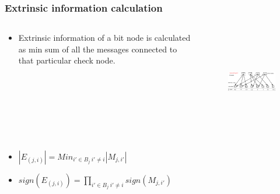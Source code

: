 \documentclass[xcolor=dvipsname]
{beamer}
\begin{document}
\begin{frame}[t]
\frametitle{ Extrinsic information calculation }  
\vspace{-5mm}
\begin{columns}[totalwidth=\textwidth]
	\begin{column}{0.3\textwidth}
	\centering
	\begin{itemize}
	\item Extrinsic information of a bit node is calculated as min sum of all the messages connected to 
	that particular check node. 	
	\end{itemize}
 
			
	\end{column}%
	   		
	\begin{column}{0.7\textwidth}
	\centering
	\begin{figure}
	\includegraphics[height=4.5cm,width=8cm]{minSum4}
	\end{figure}
	\end{column}%
\end{columns}

\begin{itemize}

\item \alert{$|E_{(j,i)}| =  Min_{i'\in B_j \ i'\neq i }|M_{j,i'}|   $ }
\item \alert{$sign({E_{(j,i)}}) =  \prod_{i'\in B_j \ i'\neq i }sign(M_{j,i'})   $ }
\end{itemize}
\end{frame}
\end{document}
